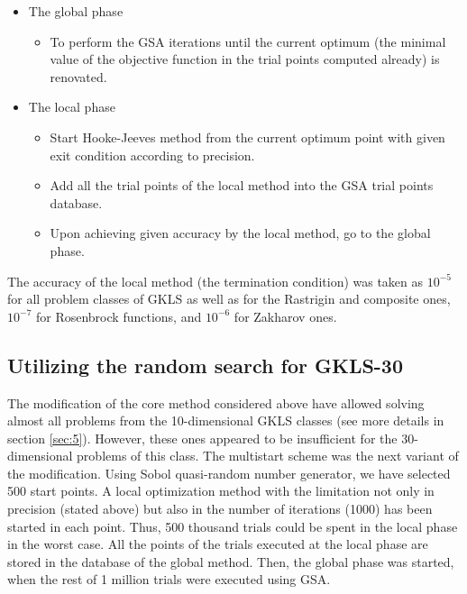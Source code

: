 \documentclass{llncs}
\begin{document}
\begin{itemize}
	\item The global phase
	
	\begin{itemize}
		\item To perform the GSA iterations until the current optimum (the minimal value of the objective function in the trial points computed already) is renovated.
	\end{itemize}
	
	\item The local phase
		\begin{itemize}
		\item Start Hooke-Jeeves method from the current optimum point with given exit condition according to precision.
		\item Add all the trial points of the local method into the GSA trial points database.
		\item Upon achieving given accuracy by the local method, go to the global phase.
	\end{itemize}

\end{itemize}


The accuracy of the local method (the termination condition) was taken as $10^{-5}$ for all problem classes of GKLS as well as for the Rastrigin and composite ones,  $10^{-7}$ for Rosenbrock functions, and $10^{-6}$ for Zakharov ones.

\subsection{Utilizing the random search for GKLS-30}\label{random}

The modification of the core method considered above have allowed solving almost all problems from the 10-dimensional GKLS classes (see more details in section \ref{sec:5}). However, these ones appeared to be insufficient for the 30-dimensional problems of this class. 
The multistart scheme was the next variant of the modification. Using Sobol quasi-random number generator, we have selected 500 start points. A local optimization method with the limitation not only in precision (stated above) but also in the number of iterations (1000) has been started in each point. Thus, 500 thousand trials could be spent in the local phase in the worst case. All the points of the trials executed at the local phase are stored in the database of the global method. Then, the global phase was started, when the rest of 1 million trials were executed using GSA.
\end{document}
